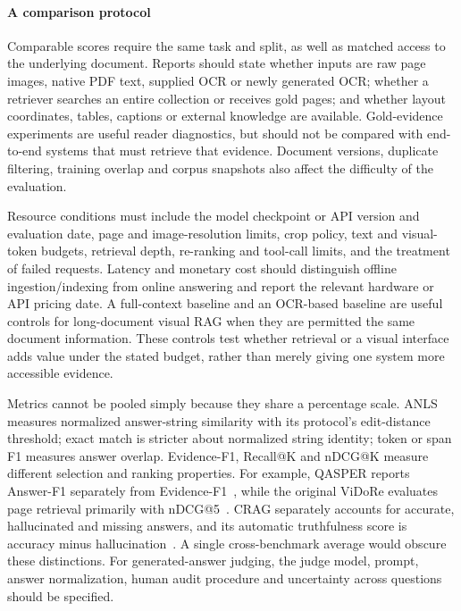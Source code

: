 \paragraph{A comparison protocol}
Comparable scores require the same task and split, as well as matched access to the underlying document. Reports should state whether inputs are raw page images, native PDF text, supplied OCR or newly generated OCR; whether a retriever searches an entire collection or receives gold pages; and whether layout coordinates, tables, captions or external knowledge are available. Gold-evidence experiments are useful reader diagnostics, but should not be compared with end-to-end systems that must retrieve that evidence. Document versions, duplicate filtering, training overlap and corpus snapshots also affect the difficulty of the evaluation.

Resource conditions must include the model checkpoint or API version and evaluation date, page and image-resolution limits, crop policy, text and visual-token budgets, retrieval depth, re-ranking and tool-call limits, and the treatment of failed requests. Latency and monetary cost should distinguish offline ingestion/indexing from online answering and report the relevant hardware or API pricing date. A full-context baseline and an OCR-based baseline are useful controls for long-document visual RAG when they are permitted the same document information. These controls test whether retrieval or a visual interface adds value under the stated budget, rather than merely giving one system more accessible evidence.

Metrics cannot be pooled simply because they share a percentage scale. ANLS measures normalized answer-string similarity with its protocol's edit-distance threshold; exact match is stricter about normalized string identity; token or span F1 measures answer overlap. Evidence-F1, Recall@K and nDCG@K measure different selection and ranking properties. For example, QASPER reports Answer-F1 separately from Evidence-F1~\cite{infoseekqa2021}, while the original ViDoRe evaluates page retrieval primarily with nDCG@5~\cite{faysse2024colpali}. CRAG separately accounts for accurate, hallucinated and missing answers, and its automatic truthfulness score is accuracy minus hallucination~\cite{crag2024}. A single cross-benchmark average would obscure these distinctions. For generated-answer judging, the judge model, prompt, answer normalization, human audit procedure and uncertainty across questions should be specified.

